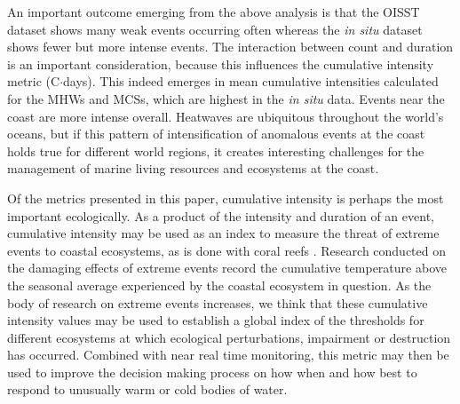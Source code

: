 \documentclass[a4paper,10pt,review]{elsarticle}
\begin{document}
An important outcome emerging from the above analysis is that the OISST dataset shows many weak events occurring often whereas the \emph{in situ} dataset shows fewer but more intense events. The interaction between count and duration is an important consideration, because this influences the cumulative intensity metric (\degree C$\cdot$days). This indeed emerges in mean cumulative intensities calculated for the MHWs and MCSs, which are highest in the \emph{in situ} data. Events near the coast are more intense overall. Heatwaves are ubiquitous throughout the world's oceans, but if this pattern of intensification of anomalous events at the coast holds true for different world regions, it creates interesting challenges for the management of marine living resources and ecosystems at the coast. %

Of the metrics presented in this paper, cumulative intensity is perhaps the most important ecologically. As a product of the intensity and duration of an event, cumulative intensity may be used as an index to measure the threat of extreme events to coastal ecosystems, as is done with coral reefs \citep[e.g.][]{Selig2010}. Research conducted on the damaging effects of extreme events \citep[e.g.][]{Wernberg2013} record the cumulative temperature above the seasonal average experienced by the coastal ecosystem in question. As the body of research on extreme events increases, we think that these cumulative intensity values may be used to establish a global index of the thresholds for different ecosystems at which ecological perturbations, impairment or destruction has occurred. Combined with near real time monitoring, this metric may then be used to improve the decision making process on how when and how best to respond to unusually warm or cold bodies of water. %
\end{document}
